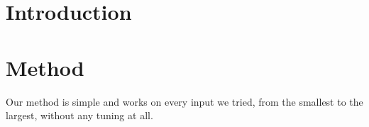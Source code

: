 \documentclass{article}
\begin{document}
\section{Introduction}


\section{Method}
Our method is simple and works on every input we tried, from the smallest
to the largest, without any tuning at all.

\par
\end{document}
